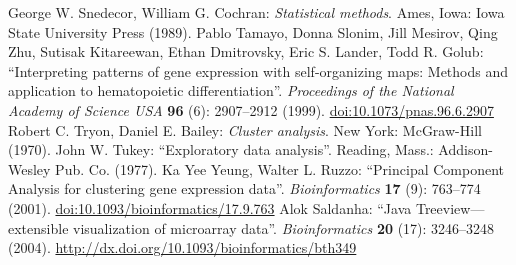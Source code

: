 \documentclass{report}
\begin{document}
\begin{thebibliography}{99}
George W. Snedecor, William G. Cochran: \textit{Statistical methods}. Ames, Iowa: Iowa State University Press (1989).
Pablo Tamayo, Donna Slonim, Jill Mesirov, Qing Zhu, Sutisak Kitareewan, Ethan Dmitrovsky, Eric S. Lander, Todd R. Golub: ``Interpreting patterns of gene expression with self-organizing maps: Methods and application to hematopoietic differentiation''. \textit{Proceedings of the National Academy of Science USA} {\bf 96} (6): 2907--2912 (1999). \href{http://dx.doi.org/10.1073/pnas.96.6.2907}{doi:10.1073/pnas.96.6.2907}
Robert C. Tryon, Daniel E. Bailey: \textit{Cluster analysis}. New York: McGraw-Hill (1970).
John W. Tukey: ``Exploratory data analysis''. Reading, Mass.: Addison-Wesley Pub. Co. (1977).
Ka Yee Yeung, Walter L. Ruzzo: ``Principal Component Analysis for clustering gene expression data''. \textit{Bioinformatics} {\bf 17} (9): 763--774 (2001). \href{http://dx.doi.org/10.1093/bioinformatics/17.9.763}{doi:10.1093/bioinformatics/17.9.763}
Alok Saldanha: ``Java Treeview---extensible visualization of microarray data''. \textit{Bioinformatics} {\bf 20} (17): 3246--3248 (2004). 
\href{http://dx.doi.org/10.1093/bioinformatics/bth349}{http://dx.doi.org/10.1093/bioinformatics/bth349}
\end{thebibliography}
\end{document}
